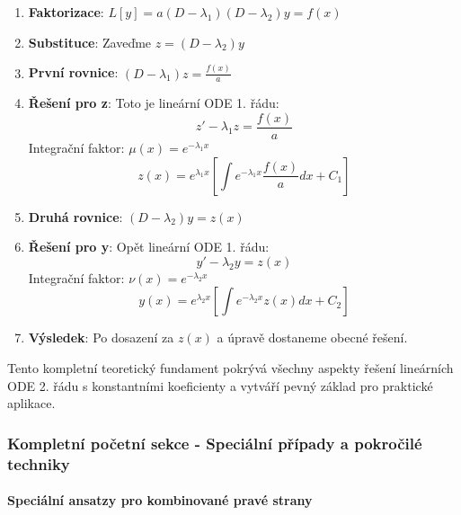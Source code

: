 \begin{enumerate}
\item \textbf{Faktorizace}: $L[y] = a(D - \lambda_1)(D - \lambda_2)y = f(x)$

\item \textbf{Substituce}: Zaveďme $z = (D - \lambda_2)y$

\item \textbf{První rovnice}: $(D - \lambda_1)z = \frac{f(x)}{a}$

\item \textbf{Řešení pro z}: Toto je lineární ODE 1. řádu:
\[
z' - \lambda_1 z = \frac{f(x)}{a}
\]
Integrační faktor: $\mu(x) = e^{-\lambda_1 x}$
\[
z(x) = e^{\lambda_1 x}\left[\int e^{-\lambda_1 x} \frac{f(x)}{a} dx + C_1\right]
\]

\item \textbf{Druhá rovnice}: $(D - \lambda_2)y = z(x)$

\item \textbf{Řešení pro y}: Opět lineární ODE 1. řádu:
\[
y' - \lambda_2 y = z(x)
\]
Integrační faktor: $\nu(x) = e^{-\lambda_2 x}$
\[
y(x) = e^{\lambda_2 x}\left[\int e^{-\lambda_2 x} z(x) dx + C_2\right]
\]

\item \textbf{Výsledek}: Po dosazení za $z(x)$ a úpravě dostaneme obecné řešení.
\end{enumerate}

Tento kompletní teoretický fundament pokrývá všechny aspekty řešení lineárních ODE 2. řádu s konstantními koeficienty a vytváří pevný základ pro praktické aplikace.

\subsubsection{Kompletní početní sekce - Speciální případy a pokročilé techniky}
\label{subsubsec:kompletni-pocetni-sekce}

\paragraph{Speciální ansatzy pro kombinované pravé strany}

